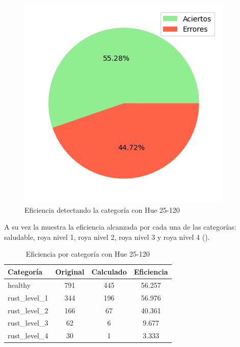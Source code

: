 \begin{figure}
\centering
\includegraphics[scale=0.6]{images/result_global_class_25_120.png}
\caption{Eficiencia detectando la categoría con Hue 25-120}
\label{img:efficiency_category_25_120}
\end{figure}

\captionsetup[figure]{skip=10pt}

A su vez la  muestra la eficiencia alcanzada por cada una de las categorías: saludable, roya nivel 1, roya nivel 2, roya nivel 3 y roya nivel 4 ().

\begin{table}[h!]
\centering
\begin{tabular}{|l|c|c|c|}
\hline 
\textbf{Categoría} & \textbf{Original} & \textbf{Calculado} & \textbf{Eficiencia} \\
\hline
healthy & 791 & 445 & 56.257 \\
\hline 
rust\_level\_1 & 344 & 196 & 56.976 \\
\hline 
rust\_level\_2 & 166 & 67 & 40.361 \\
\hline 
rust\_level\_3 & 62 & 6 & 9.677 \\
\hline 
rust\_level\_4 & 30 & 1 & 3.333 \\
\hline 
\end{tabular}
\caption{Eficiencia por categoría con Hue 25-120}
\label{table:efficiency_categories_25_120}
\end{table}

